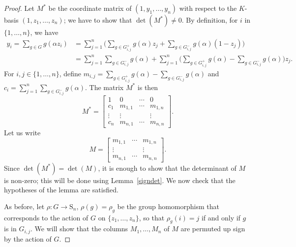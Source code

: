 \documentclass[12pt]{article}
\theoremstyle{plain}
\begin{document}
\begin{proof}
  Let $M^*$ be the coordinate matrix of $(1, y_1, \ldots,
  y_n)$ with respect to the $K$-basis $(1, z_1, \ldots, z_n)$; 
  we  have to show that $\det (M^*) \neq 0$.
  By definition, for $i$ in $\{1,\dots,n\}$, we have
  \begin{align*}
y_i = \sum_{g \in G} g ({\alpha}z_i)&= \sum_{j=1}^n \Big(\sum_{g\in G^{+}_{i,j}}g(\alpha)z_j +\sum_{g\in G^{-}_{i,j}}g(\alpha)(1-z_j)\Big)\\
&=\sum_{j=1}^n\sum_{g\in G^{-}_{i,j}}g(\alpha)+ \sum_{j=1}^n\Big(\sum_{g\in G^{+}_{i,j}}g(\alpha) -\sum_{g\in G^{-}_{i,j}}g(\alpha)\Big)z_j.
  \end{align*}
For $i,j \in \lbrace1, \ldots , n \rbrace$, define $m_{i,j} =
\sum_{g\in G^{+}_{i,j}}g(\alpha) -\sum_{g\in G^{-}_{i,j}}g(\alpha)$
and $c_i = \sum_{j=1}^n\sum_{g\in G^{-}_{i,j}}g(\alpha)$. The matrix
$M^*$ is then
$$M^* = \begin{bmatrix}
1 & 0 & \cdots & 0\\
c_1 & m_{1,1} & \cdots & m_{1,n}\\
\vdots & \vdots &  & \vdots\\
c_{n} & m_{n,1} & \cdots	& m_{n,n}
\end{bmatrix}.
$$
Let us write
$$M = \begin{bmatrix}
 m_{1,1} & \cdots & m_{1,n}\\
 \vdots &  & \vdots\\
 m_{n,1} & \cdots	& m_{n,n}
\end{bmatrix}.$$
Since $\det(M^*) = \det (M)$, it is enough to show that the
determinant of $M$ is non-zero; this will be done using
Lemma~\ref{signdet}. We now check that the hypotheses of the lemma are
satisfied.

As before, let $\rho: G \to \mathrm{S}_n$, $\rho(g) =
\rho_g$ be the group homomorphism that corresponds to the action of
$G$ on $\lbrace z_1, \ldots , z_n \rbrace$, so that $\rho_g(i) = j$ if
and only if $g$ is in $G_{i,j}$. We will show that the columns
$M_1,\dots,M_n$ of $M$ are permuted up sign by the action of $G$.


\end{proof}
\end{document}
